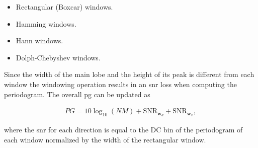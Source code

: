 	 \begin{itemize}
	 	\item Rectangular (Boxcar) windows.
	 	\item Hamming windows.
	 	\item Hann windows.
	 	\item Dolph-Chebyshev windows.
	 \end{itemize}
	
	
	Since the width of the main lobe and the height of its peak is different from each window the windowing operation results in an \gls{snr} loss when computing the periodogram.
	The overall \gls{pg} can be updated as
	
	\begin{align}
		PG = 10\log_{10}(NM) + \text{SNR}_{\bm{w}_d} + \text{SNR}_{\bm{w}_v},
		\label{eq:periodogram_processing_gain}
	\end{align}
	
	where the \gls{snr} for each direction is equal to the DC bin of the periodogram of each window normalized by the width of the rectangular window.
	
